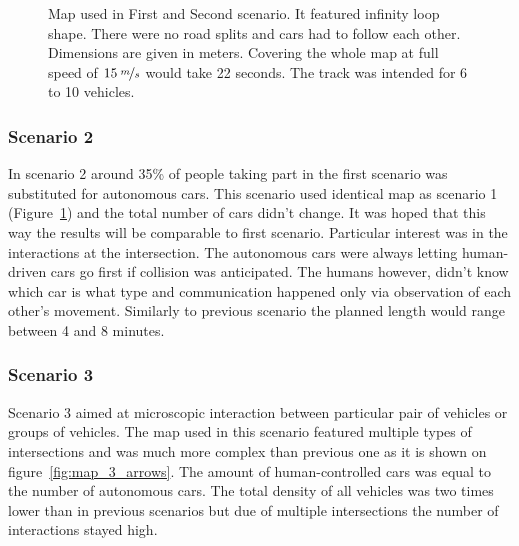\documentclass[11pt,english]{article}
\begin{document}
\begin{figure}[] %
\caption{Map used in First and Second scenario. It featured infinity loop shape. There were no road splits and cars had to follow each other. Dimensions are given in meters. Covering the whole map at full speed of $15\:\nicefrac{m}{s}$ would take 22 seconds. The track was intended for 6 to 10 vehicles.}
\label{fig:map_1_arrows}
\end{figure}


\subsubsection{Scenario 2}

In scenario 2 around 35\% of people taking part in the first scenario was substituted for autonomous cars. This scenario used identical map as scenario 1 (Figure~\ref{fig:map_1_arrows}) and the total number of cars didn't change. It was hoped that this way the results will be comparable to first scenario. Particular interest was in the interactions at the intersection. The autonomous cars were always letting human-driven cars go first if collision was anticipated. The humans however, didn't know which car is what type and communication happened only via observation of each other's movement. Similarly to previous scenario the planned length would range between 4 and 8 minutes.


\subsubsection{Scenario 3}

Scenario 3 aimed at microscopic interaction between particular pair of vehicles or groups of vehicles. The map used in this scenario featured multiple types of intersections and was much more complex than previous one as it is shown on figure~\ref{fig:map_3_arrows}. The amount of human-controlled cars was equal to the number of autonomous cars. The total density of all vehicles was two times lower than in previous scenarios but due of multiple intersections the number of interactions stayed high.
\end{document}

